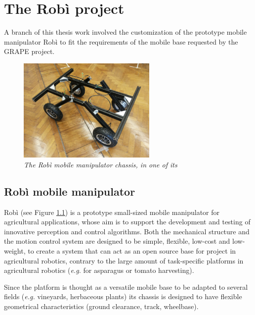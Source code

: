 
\chapter{The Robì project} \label{chap:robìProject}

A branch of this thesis work involved the customization of the prototype mobile manipulator Robì \parencite{robi} to fit the requirements of the mobile base requested by the \ac{GRAPE} project. 


\begin{figure}
	\centering
	\includegraphics[width=0.6\textwidth]{Images/robi/robi_inizio.png}
	\caption{\textit{The Robì mobile manipulator chassis, in one of its}}
	\label{fig:robiDefault}
\end{figure}


\section{Robì mobile manipulator}\label{sec:robiDescr}
Robì (see Figure \ref{fig:robiDefault}) is a prototype small-sized mobile manipulator for agricultural applications, whose aim is to support the development and testing of innovative perception and control algorithms. Both the mechanical structure and the motion control system are designed to be simple, flexible, low-cost and low-weight, to create a system that can act as an open source base for project in agricultural robotics, contrary to the large amount of task-specific platforms in agricultural robotics (\textit{e.g.} for asparagus \parencite{asparagi} or tomato \parencite{pomodori} harvesting).

\par Since the platform is thought as a versatile mobile base to be adapted to several fields (\textit{e.g.} vineyards, herbaceous plants) its chassis is designed to have flexible geometrical characteristics (ground clearance, track, wheelbase).

